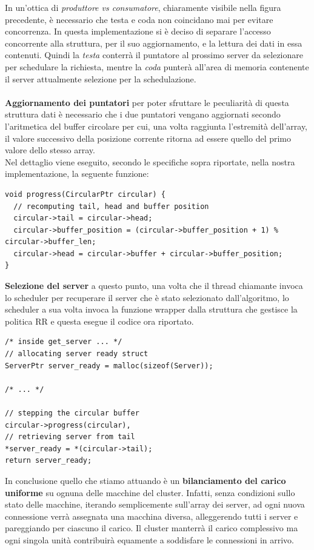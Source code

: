 \documentclass[italian]{tktltiki2}
\begin{document}
In un'ottica di \emph{produttore vs consumatore}, chiaramente visibile nella figura precedente, è necessario che testa e coda non coincidano mai per evitare concorrenza. In questa implementazione si è deciso di separare l'accesso concorrente alla struttura, per il suo aggiornamento, e la lettura dei dati in essa contenuti. Quindi la \emph{testa} conterrà il puntatore al prossimo server da selezionare per schedulare la richiesta, mentre la \emph{coda} punterà all'area di memoria contenente il server attualmente selezione per la schedulazione. 
\\
\\
\textbf{Aggiornamento dei puntatori} per poter sfruttare le peculiarità di questa struttura dati è necessario che i due puntatori vengano aggiornati secondo l'aritmetica del buffer circolare per cui, una volta raggiunta l'estremità dell'array, il valore successivo della posizione corrente ritorna ad essere quello del primo valore dello stesso array. 
\\
Nel dettaglio viene eseguito, secondo le specifiche sopra riportate, nella nostra implementazione, la seguente funzione:
\begin{lstlisting}
void progress(CircularPtr circular) {
  // recomputing tail, head and buffer position
  circular->tail = circular->head;
  circular->buffer_position = (circular->buffer_position + 1) % circular->buffer_len;
  circular->head = circular->buffer + circular->buffer_position;
}
\end{lstlisting}
\textbf{Selezione del server} a questo punto, una volta che il thread chiamante invoca lo scheduler per recuperare il server che è stato selezionato dall'algoritmo, lo scheduler a sua volta invoca la funzione wrapper dalla struttura che gestisce la politica RR e questa esegue il codice ora riportato.
\begin{lstlisting}
/* inside get_server ... */
// allocating server ready struct
ServerPtr server_ready = malloc(sizeof(Server));

/* ... */

// stepping the circular buffer
circular->progress(circular),
// retrieving server from tail 
*server_ready = *(circular->tail);
return server_ready;
\end{lstlisting}
In conclusione quello che stiamo attuando è un \textbf{bilanciamento del carico uniforme} su ognuna delle macchine del cluster. Infatti, senza condizioni sullo stato delle macchine, iterando semplicemente sull'array dei server, ad ogni nuova connessione verrà assegnata una macchina diversa, alleggerendo tutti i server e pareggiando per ciascuno il carico. Il cluster manterrà il carico complessivo ma ogni singola unità contribuirà equamente a soddisfare le connessioni in arrivo.
\newpage
\end{document}
